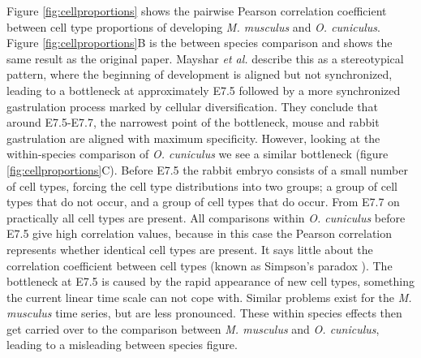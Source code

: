 Figure \ref{fig:cellproportions} shows the pairwise Pearson correlation coefficient between cell type proportions of developing \textit{M. musculus} and \textit{O. cuniculus}. Figure \ref{fig:cellproportions}B is the between species comparison and shows the same result as the original paper. Mayshar \textit{et al.} describe this as a stereotypical pattern, where the beginning of development is aligned but not synchronized, leading to a bottleneck at approximately E7.5 followed by a more synchronized gastrulation process marked by cellular diversification. They conclude that around E7.5-E7.7, the narrowest point of the bottleneck, mouse and rabbit gastrulation are aligned with maximum specificity. However, looking at the within-species comparison of \textit{O. cuniculus} we see a similar bottleneck (figure \ref{fig:cellproportions}C). Before E7.5 the rabbit embryo consists of a small number of cell types, forcing the cell type distributions into two groups; a group of cell types that do not occur, and a group of cell types that do occur. From E7.7 on practically all cell types are present. All comparisons within \textit{O. cuniculus} before E7.5 give high correlation values, because in this case the Pearson correlation represents whether identical cell types are present. It says little about the correlation coefficient between cell types (known as Simpson's paradox \cite{Saccenti2023}). The bottleneck at E7.5 is caused by the rapid appearance of new cell types, something the current linear time scale can not cope with. Similar problems exist for the \textit{M. musculus} time series, but are less pronounced. These within species effects then get carried over to the comparison between \textit{M. musculus} and \textit{O. cuniculus}, leading to a misleading between species figure.

